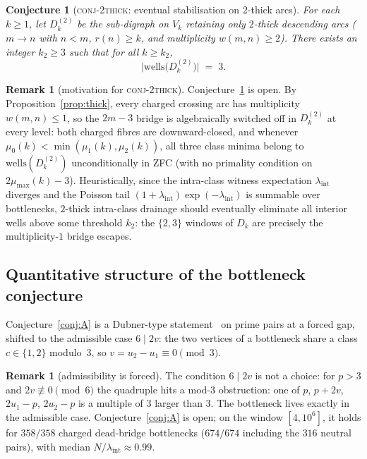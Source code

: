 \documentclass[11pt]{article}
\theoremstyle{plain}
\newtheorem{conjecture}[theorem]{Conjecture}
\theoremstyle{definition}
\newtheorem{remark}[theorem]{Remark}
\newcommand{\rch}{r}
\newcommand{\Vk}{V_{k}}
\newcommand{\Dk}{D_{k}}
\newcommand{\lam}{\lambda_{\mathrm{int}}}
\newcommand{\wells}{\mathrm{wells}}
\begin{document}
\begin{conjecture}[\textsc{conj-2thick}: eventual stabilisation on $2$-thick arcs]
\label{conj:2thick}
For each $k \ge 1$, let $\Dk^{(2)}$ be the sub-digraph on $\Vk$
retaining only $2$-thick descending arcs ($m \to n$ with $n < m$,
$\rch(n) \ge k$, and multiplicity $w(m,n) \ge 2$). There exists an
integer $k_2 \ge 3$ such that for all $k \ge k_2$,
\[
\bigl|\wells\bigl(\Dk^{(2)}\bigr)\bigr| \;=\; 3 .
\]
\end{conjecture}

\begin{remark}[motivation for \textsc{conj-2thick}]
Conjecture~\ref{conj:2thick} is open. By Proposition~\ref{prop:thick},
every charged crossing arc has multiplicity $w(m,n) \le 1$, so the
$2m - 3$ bridge is algebraically switched off in $\Dk^{(2)}$ at
every level: both charged fibres are downward-closed, and whenever
$\mu_0(k) < \min(\mu_1(k),\mu_2(k))$, all three class minima belong
to $\wells(\Dk^{(2)})$ unconditionally in ZFC (with no primality
condition on $2\mu_{\max}(k) - 3$). Heuristically, since the
intra-class witness expectation $\lam$ diverges and the Poisson tail
$(1 + \lam)\exp(-\lam)$ is summable over bottlenecks, $2$-thick
intra-class drainage should eventually eliminate all interior wells
above some threshold $k_2$: the $\{2,3\}$ windows of $\Dk$ are
precisely the multiplicity-$1$ bridge escapes.
\end{remark}

\subsection{Quantitative structure of the bottleneck conjecture}

Conjecture~\ref{conj:A} is a Dubner-type statement~\cite{dubner,oeis}
on prime pairs at a forced gap, shifted to the admissible case
$6 \mid 2v$: the two vertices of a bottleneck share a class
$c \in \{1,2\}$ modulo~$3$, so $v = u_2 - u_1 \equiv 0 \pmod 3$.

\begin{remark}[admissibility is forced]
The condition $6 \mid 2v$ is not a choice: for $p > 3$ and
$2v \not\equiv 0 \pmod 6$ the quadruple hits a mod-3 obstruction: one
of $p$, $p+2v$, $2u_1 - p$, $2u_2 - p$ is a multiple of $3$ larger
than $3$. The bottleneck lives exactly in the admissible case.
Conjecture~\ref{conj:A} is open; on the window $[4,10^6]$, it holds
for $358/358$ charged dead-bridge bottlenecks ($674/674$ including
the $316$ neutral pairs), with median $N/\lam \approx 0.99$.
\end{remark}
\end{document}
